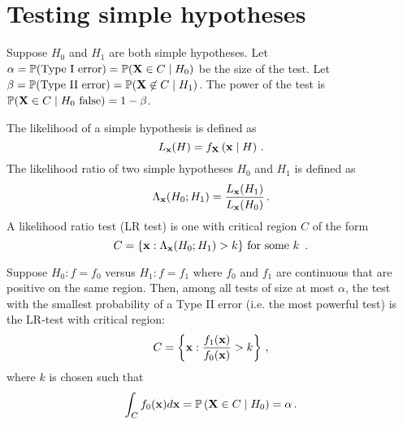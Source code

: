 \section{Testing simple hypotheses}

Suppose $H_0$ and $H_1$ are both simple hypotheses.
Let $\alpha = \mathbb{P}(\text{Type I error}) = \mathbb{P}(\mathbf{X} \in C \mid H_0)$ be the size of the test.
Let $\beta = \mathbb{P}(\text{Type II error}) = \mathbb{P}(\mathbf{X} \not\in C \mid H_1)$.
The power of the test is $\mathbb{P}(\mathbf{X} \in C \mid H_0 \text{ false}) = 1 - \beta$.

The likelihood of a simple hypothesis is defined as
\[
L_{\mathbf{x}} (H) = f_{\mathbf{X}} \left( \mathbf{x} \mid H \right) \, {.}
\]
The likelihood ratio of two simple hypotheses $H_0$ and $H_1$ is defined as
\[
\Lambda_{\mathbf{x}} (H_0; H_1) = \frac{L_{\mathbf{x}}(H_1)}{L_{\mathbf{x}}(H_0)} \, {.}
\]
A likelihood ratio test (LR test) is one with critical region $C$ of the form
\[
C = \{ \mathbf{x} : \Lambda_{\mathbf{x}}(H_0; H_1) > k \} \text{ for some $k$ }\, {.}
\]

\begin{theorem}[name=Neyman-Pearson lemma,label=thm:np]
Suppose $H_0 : f = f_0$ versus $H_1 : f = f_1$ where $f_0$ and $f_1$ are continuous \pdfs that are positive on the same region.
Then, among all tests of size at most $\alpha$, the test with the smallest probability of a Type II error (i.e. the most powerful test) is the LR-test with critical region:
\[
C = \left\{ \mathbf{x} : \frac{f_1(\mathbf{x})}{f_0(\mathbf{x})} > k \right\} \, {,}
\]
where $k$ is chosen such that
\[
\int_C f_0(\mathbf{x}) d\mathbf{x} = \mathbb{P} \left(\mathbf{X} \in C \mid H_0\right) = \alpha \, {.}
\]
\end{theorem}

